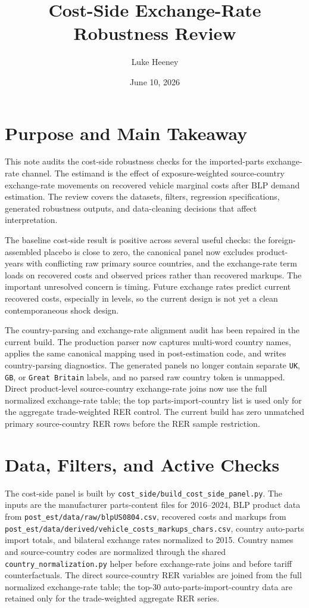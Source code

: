 \documentclass[11pt]{article}
\title{Cost-Side Exchange-Rate Robustness Review}
\author{Luke Heeney}
\date{June 10, 2026}
\begin{document}
\maketitle
\tableofcontents
\clearpage

\section{Purpose and Main Takeaway}

This note audits the cost-side robustness checks for the imported-parts exchange-rate channel. The estimand is the effect of exposure-weighted source-country exchange-rate movements on recovered vehicle marginal costs after BLP demand estimation. The review covers the datasets, filters, regression specifications, generated robustness outputs, and data-cleaning decisions that affect interpretation.

The baseline cost-side result is positive across several useful checks: the foreign-assembled placebo is close to zero, the canonical panel now excludes product-years with conflicting raw primary source countries, and the exchange-rate term loads on recovered costs and observed prices rather than recovered markups. The important unresolved concern is timing. Future exchange rates predict current recovered costs, especially in levels, so the current design is not yet a clean contemporaneous shock design.

The country-parsing and exchange-rate alignment audit has been repaired in the current build. The production parser now captures multi-word country names, applies the same canonical mapping used in post-estimation code, and writes country-parsing diagnostics. The generated panels no longer contain separate \texttt{UK}, \texttt{GB}, or \texttt{Great Britain} labels, and no parsed raw country token is unmapped. Direct product-level source-country exchange-rate joins now use the full normalized exchange-rate table; the top parts-import-country list is used only for the aggregate trade-weighted RER control. The current build has zero unmatched primary source-country RER rows before the RER sample restriction.

\section{Data, Filters, and Active Checks}

The cost-side panel is built by \texttt{cost\_side/build\_cost\_side\_panel.py}. The inputs are the manufacturer parts-content files for 2016--2024, BLP product data from \texttt{post\_est/data/raw/blpUS0804.csv}, recovered costs and markups from \texttt{post\_est/data/derived/vehicle\_costs\_markups\_chars.csv}, country auto-parts import totals, and bilateral exchange rates normalized to 2015. Country names and source-country codes are normalized through the shared \texttt{country\_normalization.py} helper before exchange-rate joins and before tariff counterfactuals. The direct source-country RER variables are joined from the full normalized exchange-rate table; the top-30 auto-parts-import-country data are retained only for the trade-weighted aggregate RER series.
\end{document}
